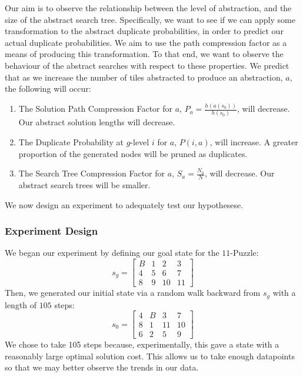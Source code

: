 \documentclass{article}
\begin{document}
Our aim is to observe the relationship between the level of abstraction,
and the size of the abstract search tree.
Specifically, we want to see if we can apply some transformation
to the abstract duplicate probabilities,
in order to predict our actual duplicate probabilities.
We aim to use the path compression factor as a means of producing this transformation.
To that end, we want to observe the behaviour of the abstract searches
with respect to these properties.
We predict that as we increase the number of tiles abstracted
to produce an abstraction, \(a\), the following will occur:
\begin{enumerate}
\item
  The Solution Path Compression Factor for \(a\), \(P_a = \frac{h(a(s_0))}{h(s_0)}\),
  will decrease. Our abstract solution lengths will decrease.
\item
  The Duplicate Probability at \(g\)-level \(i\) for \(a\), \(P(i, a)\),
  will increase. A greater proportion of the generated nodes will be pruned as duplicates.
\item
  The Search Tree Compression Factor for \(a\), \(S_a = \frac{N_a}{N}\),
  will decrease. Our abstract search trees will be smaller.
\end{enumerate}
We now design an experiment to adequately test our  hypothesese.

\subsubsection*{Experiment Design}



We began our experiment by defining our goal state for the \(11\)-Puzzle:
\[s_g =
\begin{bmatrix}
B & 1 & 2 & 3 \\
4 & 5 & 6 & 7 \\
8 & 9 & 10 & 11
\end{bmatrix}\]
Then, we generated our initial state via a random walk backward from \(s_g\) with a length of \(105\) steps:
\[s_0 =
\begin{bmatrix}
4 & B & 3 & 7 \\
8 & 1 & 11 & 10 \\
6 & 2 & 5 & 9
\end{bmatrix}\]
We chose to take 105 steps because, experimentally,
this gave a state with a reasonably large optimal solution cost.
This allows us to take enough datapoints so that we may
better observe the trends in our data. \\
\end{document}
